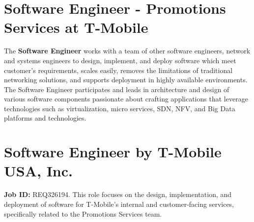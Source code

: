 \documentclass[11pt]{article}
\begin{document}


\section*{Software Engineer - Promotions Services at T-Mobile}

The \textbf{Software Engineer} works with a team of other software engineers, 
network and systems engineers to design, implement, and deploy software which 
meet customer's requirements, scales easily, removes the limitations of 
traditional networking solutions, and supports deployment in highly available 
environments. The Software Engineer participates and leads in architecture 
and design of various software components passionate about crafting 
applications that leverage technologies such as virtualization, micro 
services, SDN, NFV, and Big Data platforms and technologies.

\section*{Software Engineer by \textbf{T-Mobile USA, Inc.}}
\textbf{Job ID:} REQ326194. This role focuses on the design, implementation, 
and deployment of software for T-Mobile's internal and customer-facing 
services, specifically related to the Promotions Services team.
\end{document}
